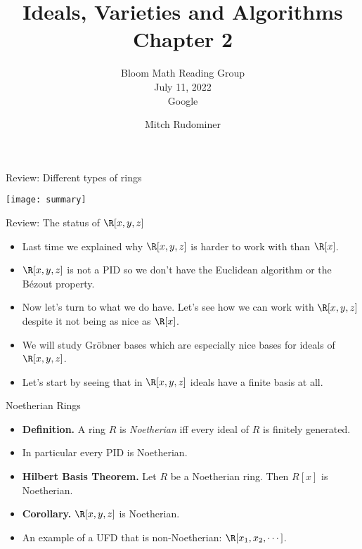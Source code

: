\documentclass{beamer}
\title{Ideals, Varieties and Algorithms \\ Chapter 2}
\subtitle{Bloom Math Reading Group \\ July 11, 2022 \\ Google}
\author{Mitch Rudominer}
\date{}
\begin{document}
\begin{frame}
  \titlepage
\end{frame}




\begin{frame}{Review: Different types of rings}

\begin{center}
\texttt{[image: summary]}
\end{center}

\end{frame}



\begin{frame}{Review: The status of $\R[x,y,z]$}

\begin{itemize}
  \item Last time we explained why $\R[x,y,z]$ is harder to work with than $\R[x]$.
  \item $\R[x,y,z]$ is not a PID so we don't have the Euclidean algorithm or the B\'{e}zout property.
  \item Now let's turn to what we do have. Let's see how we can work with $\R[x,y,z]$ despite it not being as nice as $\R[x]$.
  \item We will study Gr\"{o}bner bases which are especially nice bases for ideals of $\R[x,y,z]$.
  \item Let's start by seeing that in $\R[x,y,z]$ ideals have a finite basis at all.
\end{itemize}

\end{frame}



\begin{frame}{Noetherian Rings}

\begin{itemize}
  \item \textbf{Definition.} A ring $R$ is \emph{Noetherian} iff every ideal of $R$ is finitely generated.
  \item In particular every PID is Noetherian.
  \item \textbf{Hilbert Basis Theorem.} Let $R$ be a Noetherian ring. Then $R[x]$ is Noetherian.
  \item \textbf{Corollary.} $\R[x,y,z]$ is Noetherian.
  \item An example of a UFD that is non-Noetherian: $\R[x_1, x_2, \cdots]$.
\end{itemize}

\end{frame}
\end{document}
